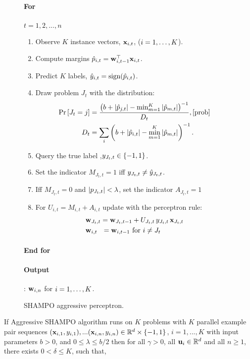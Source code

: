 {\begin{figure}[h]
\paragraph{For}  {$t=1,2, ..., n$} 
\begin{enumerate}
\nolineskips
\item Observe $K$ instance vectors, $\mathbf{x}_{i,t}$, ($i=1 , \ldots , K$).
\item Compute margins $\hat{p}_{i,t}={\mathbf{w}}^{\top}_{i,t-1} \mathbf{x}_{i,t}$.
\item Predict $K$ labels, $\hat{y}_{i,t}={\rm sign}(\hat{p}_{i,t})$.
\item Draw problem $J_t$  with the distribution:
\begin{align}
\pr{J_t=j} &=
\frac{\paren{b+\abs{\hat{p}_{j,t}}-\min_{m=1}^K\abs{\hat{p}_{m,t}}}^{-1}}{D_{t}}, \eqref{prob}\nonumber\\
D_t &=
\sum_i \paren{b+\abs{\hat{p}_{i,t}}-\min_{m=1}^K\abs{\hat{p}_{m,t}}}^{-1}. \nonumber
\end{align}
\item Query the true label ,$y_{J_t,t}\in\{-1,1\}$.
\item Set the indicator $M_{J_t, t}=1$ iff $y_{J_t,t} \neq \hat{y}_{J_t,t}$.
\item Iff $M_{J_t, t}=0$ and $\left\vert{p_{J_t,t}}\right\vert<\lambda$, set  the indicator $A_{J_t,t}=1$
\item For $U_{i,t}=M_{i,t}+A_{i,t}$ update with the perceptron rule:
\begin{align}
&\mathbf{w}_{J_t,t} = \mathbf{w}_{J_t,t-1}+U_{J_t,t} \, y_{J_t,t}\, \mathbf{x}_{J_t,t} \\
&\mathbf{w}_{i,t} ~~= \mathbf{w}_{i,t-1}  \textrm{ for } i \neq J_t \nonumber
\end{align}
\end{enumerate}
\paragraph{End for} 
\paragraph{Output}: $\mathbf{w}_{i,n}$ for $i=1 , \ldots , K$.
\caption{SHAMPO aggressive perceptron. \label{alg:SHAMPO_FO}}
\end{figure}        


\begin{theorem}
  If Aggressive SHAMPO algorithm runs on $K$ problems with $K$ parallel example pair
  sequences
  $(\mathbf{x}_{i,1},y_{i,1}),...(\mathbf{x}_{i,n},y_{i,n})\in\mathbb{R}^d\times\{-1,1\}$,
  $i=1,...,K$ with input parameters $b>0$, and $0 \le \lambda \le b/2$ then for all $\gamma>0$, all
  $\mathbf{u}_{i}\in\mathbb{R}^d$ and all $n\ge1$, there exists $0<\delta\le K$, such that,
  

\end{theorem}}
